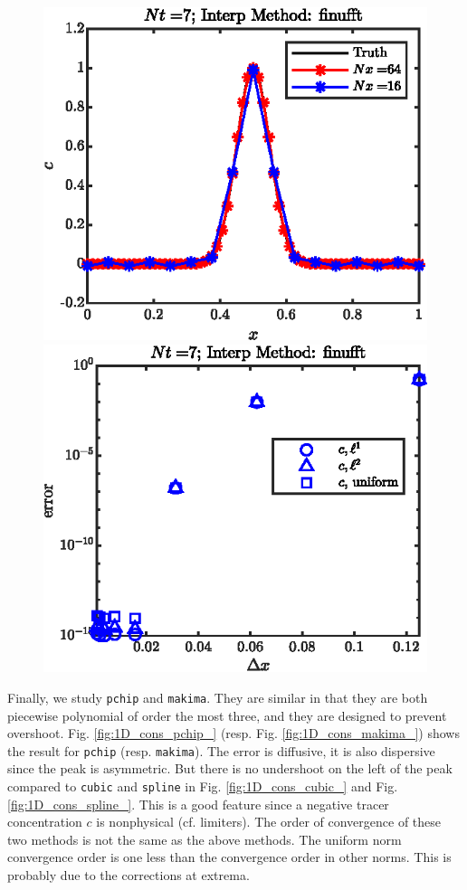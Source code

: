 \documentclass[11pt,letterpaper]{article}
\begin{document}
\begin{figure}[H]
    \centering
    \includegraphics{figs/1D_cons_finufft_sol}
    \includegraphics{figs/1D_cons_finufft_convord}
    \caption{}\label{fig:1D_cons_finufft_}
\end{figure}
Finally, we study \texttt{pchip} and \texttt{makima}. They are similar in that they are both piecewise polynomial of order the most three, and they are designed to prevent overshoot. Fig. \ref{fig:1D_cons_pchip_} (resp. Fig. \ref{fig:1D_cons_makima_}) shows the result for \texttt{pchip} (resp. \texttt{makima}). The error is diffusive, it is also dispersive since the peak is asymmetric. But there is no undershoot on the left of the peak compared to \texttt{cubic} and \texttt{spline} in Fig. \ref{fig:1D_cons_cubic_} and Fig. \ref{fig:1D_cons_spline_}. This is a good feature since a negative tracer concentration $c$ is nonphysical (cf. limiters). The order of convergence of these two methods is not the same as the above methods. The uniform norm convergence order is one less than the convergence order in other norms. This is probably due to the corrections at extrema. 
\end{document}
